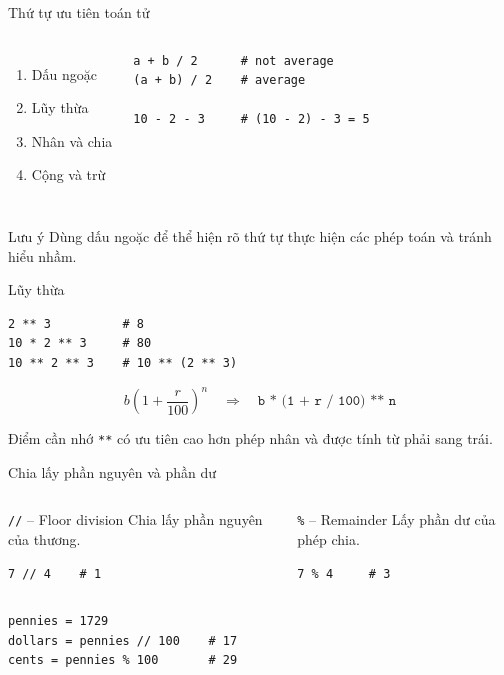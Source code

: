 \documentclass[aspectratio=169,10pt]{beamer}
\begin{document}
\begin{frame}[fragile]{Thứ tự ưu tiên toán tử}
\begin{columns}[T,onlytextwidth]
\begin{enumerate}
  \item Dấu ngoặc
  \item Lũy thừa
  \item Nhân và chia
  \item Cộng và trừ
\end{enumerate}
\begin{lstlisting}
a + b / 2      # not average
(a + b) / 2    # average

10 - 2 - 3     # (10 - 2) - 3 = 5
\end{lstlisting}
\end{columns}
\begin{alertblock}{Lưu ý}
Dùng dấu ngoặc để thể hiện rõ thứ tự thực hiện các phép toán và tránh hiểu nhầm.
\end{alertblock}
\end{frame}

\begin{frame}[fragile]{Lũy thừa}
\begin{lstlisting}
2 ** 3          # 8
10 * 2 ** 3     # 80
10 ** 2 ** 3    # 10 ** (2 ** 3)
\end{lstlisting}
\[
b\left(1+\frac{r}{100}\right)^n
\quad \Longrightarrow \quad
\texttt{b * (1 + r / 100) ** n}
\]
\begin{block}{Điểm cần nhớ}
\texttt{**} có ưu tiên cao hơn phép nhân và được tính từ phải sang trái.
\end{block}
\end{frame}

\begin{frame}[fragile]{Chia lấy phần nguyên và phần dư}
\begin{columns}[T,onlytextwidth]
\begin{block}{\texttt{//} -- Floor division}
Chia lấy phần nguyên của thương.
\begin{lstlisting}
7 // 4    # 1
\end{lstlisting}
\end{block}
\begin{block}{\texttt{\%} -- Remainder}
Lấy phần dư của phép chia.
\begin{lstlisting}
7 % 4     # 3
\end{lstlisting}
\end{block}
\end{columns}
\vspace{0.2cm}
\begin{lstlisting}
pennies = 1729
dollars = pennies // 100    # 17
cents = pennies % 100       # 29
\end{lstlisting}
\end{frame}
\end{document}
